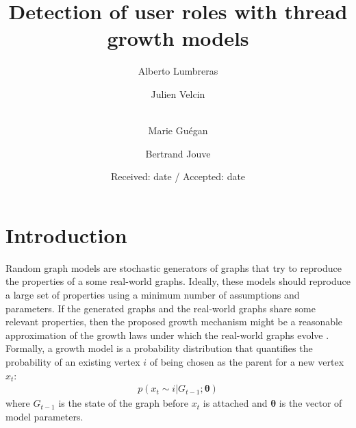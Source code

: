 \documentclass[smallextended]{svjour3}          %
\begin{document}
\title{Detection of user roles with thread growth models}

\author{Alberto Lumbreras \and
        Julien Velcin  \and\\
        Marie Guégan \and
        Bertrand Jouve
}



\date{Received: date / Accepted: date}

\maketitle


\section{Introduction}
Random graph models are stochastic generators of graphs that try to reproduce the properties of a some real-world graphs. Ideally, these models should reproduce a large set of properties using a minimum number of assumptions and parameters. If the generated graphs and the real-world graphs share some relevant properties, then the proposed growth mechanism might be a reasonable approximation of the growth laws under which the real-world graphs evolve \citep{Kolaczyk2009}. Formally, a growth model is a probability distribution that quantifies the probability of an existing vertex $i$ of being chosen as the parent for a new vertex $x_t$:
\begin{align*}
p(x_t \sim i | G_{t-1}; \boldsymbol{\theta})
\label{eq:growth_model}
\end{align*} 
where $G_{t-1}$ is the state of the graph before $x_t$ is attached and $\boldsymbol{\theta}$ is the vector of model parameters.
\end{document}
